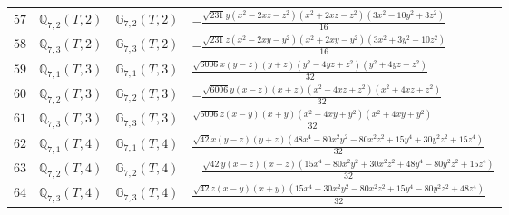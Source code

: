 \documentclass[fleqn,8pt,landscape]{jsarticle}
\begin{document}
\begin{table}[ht!]
\begin{center}
\begin{tabular}{cccl}
$ 57 $ & $ \mathbb{Q}_{7,2}(T,2) $ & $ \mathbb{G}_{7,2}(T,2) $ & $ - \frac{\sqrt{231} y \left(x^{2} - 2 x z - z^{2}\right) \left(x^{2} + 2 x z - z^{2}\right) \left(3 x^{2} - 10 y^{2} + 3 z^{2}\right)}{16} $ \\
$ 58 $ & $ \mathbb{Q}_{7,3}(T,2) $ & $ \mathbb{G}_{7,3}(T,2) $ & $ - \frac{\sqrt{231} z \left(x^{2} - 2 x y - y^{2}\right) \left(x^{2} + 2 x y - y^{2}\right) \left(3 x^{2} + 3 y^{2} - 10 z^{2}\right)}{16} $ \\
$ 59 $ & $ \mathbb{Q}_{7,1}(T,3) $ & $ \mathbb{G}_{7,1}(T,3) $ & $ \frac{\sqrt{6006} x \left(y - z\right) \left(y + z\right) \left(y^{2} - 4 y z + z^{2}\right) \left(y^{2} + 4 y z + z^{2}\right)}{32} $ \\
$ 60 $ & $ \mathbb{Q}_{7,2}(T,3) $ & $ \mathbb{G}_{7,2}(T,3) $ & $ - \frac{\sqrt{6006} y \left(x - z\right) \left(x + z\right) \left(x^{2} - 4 x z + z^{2}\right) \left(x^{2} + 4 x z + z^{2}\right)}{32} $ \\
$ 61 $ & $ \mathbb{Q}_{7,3}(T,3) $ & $ \mathbb{G}_{7,3}(T,3) $ & $ \frac{\sqrt{6006} z \left(x - y\right) \left(x + y\right) \left(x^{2} - 4 x y + y^{2}\right) \left(x^{2} + 4 x y + y^{2}\right)}{32} $ \\
$ 62 $ & $ \mathbb{Q}_{7,1}(T,4) $ & $ \mathbb{G}_{7,1}(T,4) $ & $ \frac{\sqrt{42} x \left(y - z\right) \left(y + z\right) \left(48 x^{4} - 80 x^{2} y^{2} - 80 x^{2} z^{2} + 15 y^{4} + 30 y^{2} z^{2} + 15 z^{4}\right)}{32} $ \\
$ 63 $ & $ \mathbb{Q}_{7,2}(T,4) $ & $ \mathbb{G}_{7,2}(T,4) $ & $ - \frac{\sqrt{42} y \left(x - z\right) \left(x + z\right) \left(15 x^{4} - 80 x^{2} y^{2} + 30 x^{2} z^{2} + 48 y^{4} - 80 y^{2} z^{2} + 15 z^{4}\right)}{32} $ \\
$ 64 $ & $ \mathbb{Q}_{7,3}(T,4) $ & $ \mathbb{G}_{7,3}(T,4) $ & $ \frac{\sqrt{42} z \left(x - y\right) \left(x + y\right) \left(15 x^{4} + 30 x^{2} y^{2} - 80 x^{2} z^{2} + 15 y^{4} - 80 y^{2} z^{2} + 48 z^{4}\right)}{32} $ \\
 \hline \hline
\end{tabular}
\end{center}
\end{table}
\end{document}
